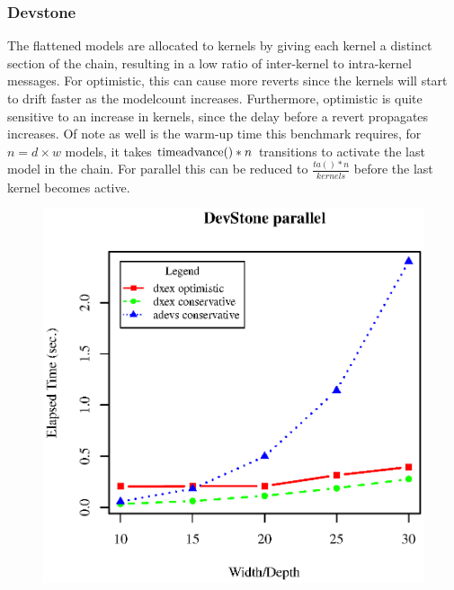 \subsubsection{Devstone}
The flattened models are allocated to kernels by giving each kernel a distinct section of the chain, resulting in a low ratio of inter-kernel to intra-kernel messages. For optimistic, this can cause more reverts since the kernels will start to drift faster as the modelcount increases. Furthermore, optimistic is quite sensitive to an increase in kernels, since the delay before a revert propagates increases. Of note as well is the warm-up time this benchmark requires, for $n=d\times w$ models, it takes $\textup{timeadvance}()*n$ transitions to activate the last model in the chain. For parallel this can be reduced to $\frac{ta()*n}{kernels}$ before the last kernel becomes active.\\
\begin{figure}[ltbh]
	\includegraphics[width=.5\textwidth]{fig/fig2.eps}
	\label{fig2.eps}
\end{figure}
